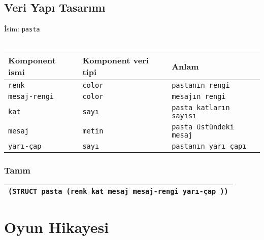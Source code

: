 \documentclass[12pt, a4paper]{article}
\begin{document}
\newpage

\subsection*{Veri Yapı Tasarımı}
İsim: \texttt{pasta}\\
\vspace{0.5cm}\\
\begin{tabular}{| p{4cm} | p{4cm} | p{8cm} |  }
\hline			
Komponent ismi&Komponent veri tipi&Anlam\\
\hline
\texttt{renk}&\texttt{color} &\texttt{pastanın rengi}\\[10ex]
\hline  
\texttt{mesaj-rengi}&\texttt{color} &\texttt{mesajın rengi} \\[10ex]
\hline  
\texttt{kat}&\texttt{sayı} &\texttt{pasta katların sayısı} \\[10ex]
\hline  
\texttt{mesaj}&\texttt{metin} &\texttt{pasta üstündeki mesaj} \\[10ex]
\hline  
\texttt{yarı-çap}&\texttt{sayı} &\texttt{pastanın yarı çapı} \\[10ex]
\hline  
\end{tabular}

\subsubsection*{Tanım}
\begin{tabular}{| p{17cm} |  }
\hline			
\vspace{0.5cm}
\texttt{(STRUCT pasta (renk kat mesaj mesaj-rengi yarı-çap ))}\\[10ex]
\hline
\end{tabular}













\newpage
\section*{Oyun Hikayesi}
 
\end{document}
